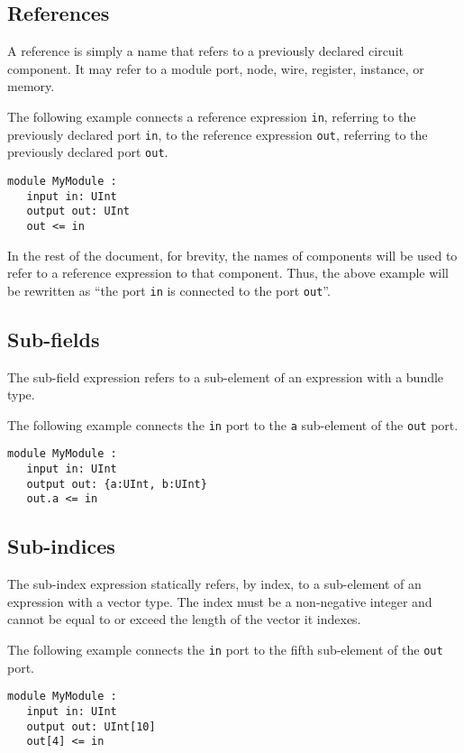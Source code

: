 \documentclass[12pt]{article}
\begin{document}
\subsection{References}
A reference is simply a name that refers to a previously declared circuit component. It may refer to a module port, node, wire, register, instance, or memory.

The following example connects a reference expression \verb|in|, referring to the previously declared port \verb|in|, to the reference expression \verb|out|, referring to the previously declared port \verb|out|.

\begin{lstlisting}
module MyModule :
   input in: UInt
   output out: UInt
   out <= in
\end{lstlisting}

In the rest of the document, for brevity, the names of components will be used to refer to a reference expression to that component. Thus, the above example will be rewritten as ``the port \verb|in| is connected to the port \verb|out|''.

\subsection{Sub-fields}\label{subfields}
The sub-field expression refers to a sub-element of an expression with a bundle type.

The following example connects the \verb|in| port to the \verb|a| sub-element of the \verb|out| port.
\begin{lstlisting}
module MyModule :
   input in: UInt
   output out: {a:UInt, b:UInt}
   out.a <= in
\end{lstlisting}

\subsection{Sub-indices}\label{subindices}
The sub-index expression statically refers, by index, to a sub-element of an expression with a vector type. The index must be a non-negative integer and cannot be equal to or exceed the length of the vector it indexes.

The following example connects the \verb|in| port to the fifth sub-element of the \verb|out| port.
\begin{lstlisting}
module MyModule :
   input in: UInt
   output out: UInt[10]
   out[4] <= in
\end{lstlisting}
\end{document}
